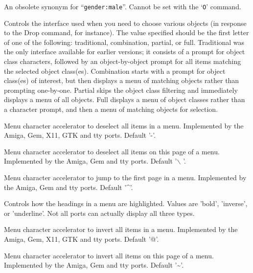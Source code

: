 \item[\ib{male}]
An obsolete synonym for ``{\tt gender:male}''.
Cannot be set with the `{\tt O}' command.

\item[\ib{menustyle}]
Controls the interface used when you need to choose various objects (in
response to the Drop command, for instance).  The value specified should
be the first letter of one of the following:  traditional, combination,
partial, or full.  Traditional was the only interface available for
earlier versions; it consists of a prompt for object class characters,
followed by an object-by-object prompt for all items matching the selected
object class(es).  Combination starts with a prompt for object class(es)
of interest, but then displays a menu of matching objects rather than
prompting one-by-one.  Partial skips the object class filtering and
immediately displays a menu of all objects.  Full displays a menu of
object classes rather than a character prompt, and then a menu of matching
objects for selection.

\item[\ib{menu\_deselect\_all}]
Menu character accelerator to deselect all items in a menu.
Implemented by the Amiga, Gem, X11, GTK and tty ports.
Default '-'.

\item[\ib{menu\_deselect\_page}]
Menu character accelerator to deselect all items on this page of a menu.
Implemented by the Amiga, Gem and tty ports.
Default '$\backslash$ '.

\item[\ib{menu\_first\_page}]
Menu character accelerator to jump to the first page in a menu.
Implemented by the Amiga, Gem and tty ports.
Default '\^{}'.

\item[\ib{menu\_headings}]
Controls how the headings in a menu are highlighted.
Values are 'bold', 'inverse', or 'underline'.
Not all ports can actually display all three types.

\item[\ib{menu\_invert\_all}]
Menu character accelerator to invert all items in a menu.
Implemented by the Amiga, Gem, X11, GTK and tty ports.
Default '@'.

\item[\ib{menu\_invert\_page}]
Menu character accelerator to invert all items on this page of a menu.
Implemented by the Amiga, Gem and tty ports.
Default '\~{}'.

